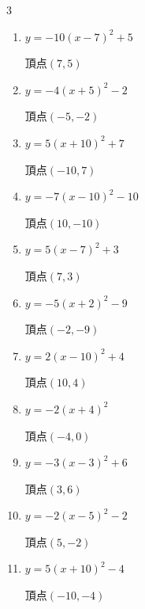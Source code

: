\begin{multicols}{3}
\begin{enumerate}
        $\displaystyle 頂点\left( -4 , -6 \right)$

  \item $\displaystyle y=-10\left( x-7\right)^{2}+5$

        $\displaystyle 頂点\left( 7 , 5 \right)$

  \item $\displaystyle y=-4\left( x+5\right)^{2}-2$

        $\displaystyle 頂点\left( -5 , -2 \right)$

  \item $\displaystyle y=5\left( x+10\right)^{2}+7$

        $\displaystyle 頂点\left( -10 , 7 \right)$

  \item $\displaystyle y=-7\left( x-10\right)^{2}-10$

        $\displaystyle 頂点\left( 10 , -10 \right)$

  \item $\displaystyle y=5\left( x-7\right)^{2}+3$

        $\displaystyle 頂点\left( 7 , 3 \right)$

  \item $\displaystyle y=-5\left( x+2\right)^{2}-9$

        $\displaystyle 頂点\left( -2 , -9 \right)$

\columnbreak %

  \item $\displaystyle y=2\left( x-10\right)^{2}+4$

        $\displaystyle 頂点\left( 10 , 4 \right)$

  \item $\displaystyle y=-2\left( x+4\right)^{2}$

        $\displaystyle 頂点\left( -4 , 0 \right)$

  \item $\displaystyle y=-3\left( x-3\right)^{2}+6$

        $\displaystyle 頂点\left( 3 , 6 \right)$

  \item $\displaystyle y=-2\left( x-5\right)^{2}-2$

        $\displaystyle 頂点\left( 5 , -2 \right)$

  \item $\displaystyle y=5\left( x+10\right)^{2}-4$

        $\displaystyle 頂点\left( -10 , -4 \right)$


\end{enumerate}
\end{multicols}
